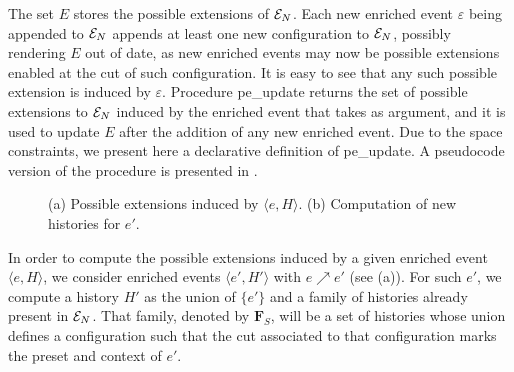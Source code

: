 \documentclass[11pt,a4paper]{article}
\newcommand{\peupdate}{\mbox{\sf pe\_update}}
\begin{document}
The set $E$ stores the possible extensions of $\mathcal{E}_{N}$.  Each new enriched
event $\varepsilon$ being appended to $\mathcal{E}_{N}$ appends at least one new
configuration to $\mathcal{E}_{N}$, possibly rendering $E$ out of date, as new enriched
events may now be possible extensions enabled at the cut of such configuration.
It is easy to see that any such possible extension is induced by $\varepsilon$.
Procedure \peupdate{} returns the set of possible extensions to $\mathcal{E}_{N}$
induced by the enriched event that takes as argument, and it is used to update
$E$ after the addition of any new enriched event.  Due to the space
constraints, we present here a declarative definition of \peupdate{}.  A
pseudocode version of the procedure is presented in .

\begin{figure}[b]
\caption{(a) Possible extensions induced by $\langle e, H \rangle$. (b)
Computation of new histories for $e'$.}
\label{fig:possible.extensions}
\end{figure}

In order to compute the possible extensions induced by a given enriched event
$\langle e, H \rangle$, we consider enriched events $\langle e', H' \rangle$
with $e \nearrow e'$ (see  (a)).  For such $e'$, we
compute a history $H'$ as the union of $\{e'\}$ and a family of histories
already present in $\mathcal{E}_{N}$.  That family, denoted by $\mathbf{F}_S$, will be a
set of histories whose union defines a configuration such that the cut
associated to that configuration marks the preset and context of $e'$.
\end{document}
